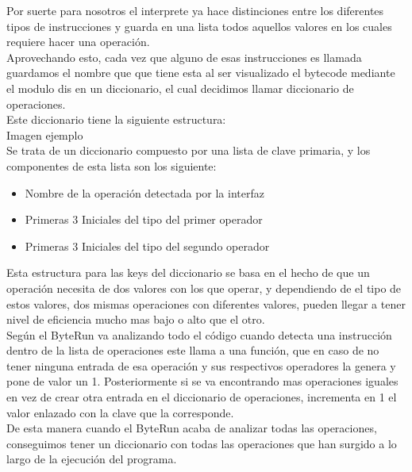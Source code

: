 Por suerte para nosotros el interprete ya hace distinciones entre los diferentes tipos de instrucciones y guarda en una lista todos aquellos valores en los cuales requiere hacer una operación.\\

Aprovechando esto, cada vez que alguno de esas instrucciones es llamada guardamos el nombre que que tiene esta al ser visualizado el bytecode mediante el modulo dis en un diccionario, el cual decidimos llamar diccionario de operaciones.\\

Este diccionario tiene la siguiente estructura:\\

Imagen ejemplo\\

Se trata de un diccionario compuesto por una lista de clave primaria, y los componentes de esta lista son los siguiente:
\begin{itemize}
	\item Nombre de la operación detectada por la interfaz
	\item Primeras 3 Iniciales del tipo del primer operador 
	\item Primeras 3 Iniciales del tipo del segundo operador 
\end{itemize}




Esta estructura para las keys del diccionario se basa en el hecho de que un operación necesita de dos valores con los que operar, y dependiendo de el tipo de estos valores, dos mismas operaciones con diferentes valores, pueden llegar a tener nivel de eficiencia mucho mas bajo o alto que el otro. \\

Según el ByteRun va analizando todo el código cuando detecta una instrucción dentro de la lista de operaciones este llama a una función, que en caso de no tener ninguna entrada de esa operación y sus respectivos operadores la genera y pone de valor un 1. Posteriormente si se va encontrando mas operaciones iguales en vez de crear otra entrada en el diccionario de operaciones, incrementa en 1 el valor enlazado con la clave que la corresponde.\\

De esta manera cuando el ByteRun acaba de analizar todas las operaciones, conseguimos tener un diccionario con todas las operaciones que han surgido a lo largo de la ejecución del programa.\\

